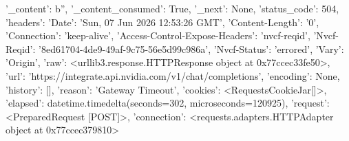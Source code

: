 
{'_content': b'', '_content_consumed': True, '_next': None, 'status_code': 504, 'headers': {'Date': 'Sun, 07 Jun 2026 12:53:26 GMT', 'Content-Length': '0', 'Connection': 'keep-alive', 'Access-Control-Expose-Headers': 'nvcf-reqid', 'Nvcf-Reqid': '8ed61704-4de9-49af-9c75-56e5d99c986a', 'Nvcf-Status': 'errored', 'Vary': 'Origin'}, 'raw': <urllib3.response.HTTPResponse object at 0x77ccec33fe50>, 'url': 'https://integrate.api.nvidia.com/v1/chat/completions', 'encoding': None, 'history': [], 'reason': 'Gateway Timeout', 'cookies': <RequestsCookieJar[]>, 'elapsed': datetime.timedelta(seconds=302, microseconds=120925), 'request': <PreparedRequest [POST]>, 'connection': <requests.adapters.HTTPAdapter object at 0x77ccec379810>}
